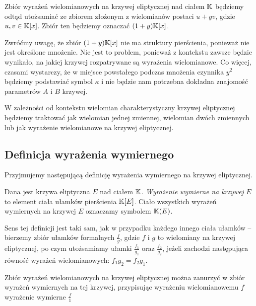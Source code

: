 \begin{remark}
Zbiór wyrażeń wielomianowych na krzywej eliptycznej nad ciałem $\mathbb{K}$
będziemy odtąd utożsamiać ze zbiorem
złożonym z wielomianów postaci $u + yv$,
gdzie $u, v \in \mathbb{K}[x]$.
Zbiór ten będziemy oznaczać $(1 + y)\mathbb{K}[x]$.
\end{remark}

Zwróćmy uwagę, że zbiór $(1 + y)\mathbb{K}[x]$ nie ma struktury pierścienia,
ponieważ nie jest określone mnożenie.
Nie jest to problem,
ponieważ z kontekstu zawsze będzie wynikało,
na jakiej krzywej rozpatrywane są wyrażenia wielomianowe.
Co więcej, czasami wystarczy,
że w miejsce powstałego podczas mnożenia czynnika $y^2$
będziemy podstawiać symbol $\kappa$
i nie będzie nam potrzebna dokładna znajomość parametrów $A$ i $B$ krzywej.

\begin{remark}
W zależności od kontekstu wielomian charakterystyczny krzywej eliptycznej
będziemy traktować jak wielomian jednej zmiennej, wielomian dwóch zmiennych
lub jak wyrażenie wielomianowe na krzywej eliptycznej.
\end{remark}

\subsection*{Definicja wyrażenia wymiernego}

Przyjmujemy następującą definicję
wyrażenia wymiernego na krzywej eliptycznej.

\begin{definition}
Dana jest krzywa eliptyczna $E$ nad ciałem $\mathbb{K}$.
\emph{Wyrażenie wymierne na krzywej $E$}
to element ciała ułamków pierścienia $\mathbb{K}[E]$.
Ciało wszystkich wyrażeń wymiernych na krzywej $E$
oznaczamy symbolem $\mathbb{K}(E)$.
\end{definition}

Sens tej definicji jest taki sam,
jak w przypadku każdego innego ciała ułamków --
bierzemy zbiór ułamków formalnych $\frac{f}{g}$,
gdzie $f$ i $g$ to wielomiany na krzywej eliptycznej,
po czym utożsamiamy ułamki $\frac{f_1}{g_1}$ oraz $\frac{f_2}{g_2}$,
jeżeli zachodzi następująca równość wyrażeń wielomianowych:
$f_1g_2 = f_2g_1$.

\begin{fact}
Zbiór wyrażeń wielomianowych na krzywej eliptycznej
można zanurzyć w zbiór wyrażeń wymiernych na tej krzywej,
przypisując wyrażeniu wielomianowemu $f$ wyrażenie wymierne $\frac{f}{1}$
\end{fact}

